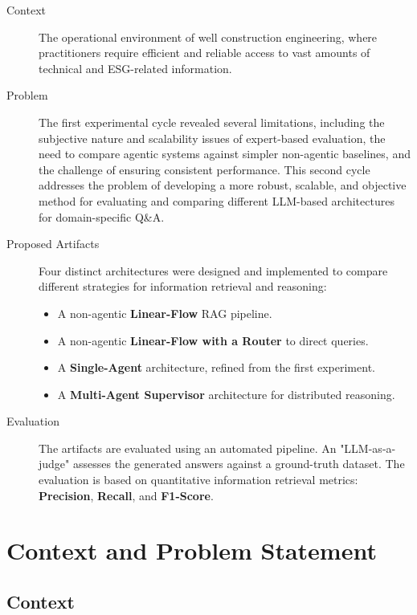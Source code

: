     \begin{description}
        \item[Context] The operational environment of well construction engineering, where practitioners require efficient and reliable access to vast amounts of technical and ESG-related information.

        \item[Problem] The first experimental cycle revealed several limitations, including the subjective nature and scalability issues of expert-based evaluation, the need to compare agentic systems against simpler non-agentic baselines, and the challenge of ensuring consistent performance. This second cycle addresses the problem of developing a more robust, scalable, and objective method for evaluating and comparing different LLM-based architectures for domain-specific Q\&A.

        \item[Proposed Artifacts] Four distinct architectures were designed and implemented to compare different strategies for information retrieval and reasoning:
        \begin{itemize}
            \item A non-agentic \textbf{Linear-Flow} RAG pipeline.
            \item A non-agentic \textbf{Linear-Flow with a Router} to direct queries.
            \item A \textbf{Single-Agent} architecture, refined from the first experiment.
            \item A \textbf{Multi-Agent Supervisor} architecture for distributed reasoning.
        \end{itemize}

        \item[Evaluation] The artifacts are evaluated using an automated pipeline. An "LLM-as-a-judge" assesses the generated answers against a ground-truth dataset. The evaluation is based on quantitative information retrieval metrics: \textbf{Precision}, \textbf{Recall}, and \textbf{F1-Score}.
    \end{description}

\section{Context and Problem Statement}

    \subsection{Context}

